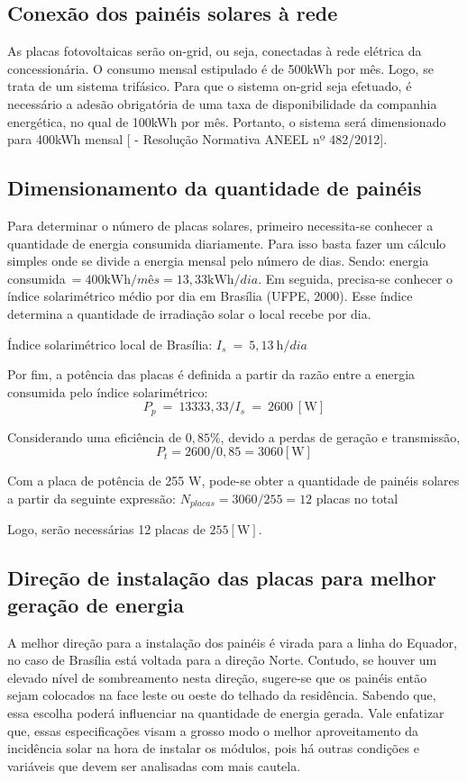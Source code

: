 \subsection{Conexão dos painéis solares à rede}

	As placas fotovoltaicas serão on-grid, ou seja, conectadas à rede elétrica da concessionária. O consumo mensal estipulado é de 500kWh por mês. Logo, se trata de um sistema trifásico. Para que o sistema on-grid seja efetuado, é necessário a adesão obrigatória de uma taxa de disponibilidade da companhia energética, no qual de 100kWh por mês. Portanto, o sistema será dimensionado para 400kWh mensal [\cite{2013Aneel} -  Resolução Normativa ANEEL nº 482/2012].

\subsection{Dimensionamento da quantidade de painéis}

	Para determinar o número de placas solares, primeiro necessita-se conhecer a quantidade de energia consumida diariamente. Para isso basta fazer um cálculo simples onde se divide a energia mensal pelo número de dias. Sendo: energia consumida$\ = 400 \si{\kilo\watt\hour}/mês = 13,33 \si{\kilo\watt\hour}/dia$. Em seguida, precisa-se conhecer o índice solarimétrico médio por dia em Brasília (UFPE, 2000). Esse índice determina a quantidade de irradiação solar o local recebe por dia.

	Índice solarimétrico local de Brasília: $I_s\ =\ 5,13\ \si{\hour}/dia$

	Por fim, a potência das placas é definida a partir da razão entre a energia consumida pelo índice solarimétrico:$$P_p\ =\ 13333,33/I_s\ =\ 2600\ [\si{\watt}]$$

	Considerando uma eficiência de $0,85\%$, devido a perdas de geração e transmissão, $$P_t = 2600/0,85 = 3060 [\si{\watt}]$$

	Com a placa de potência de 255 W, pode-se obter a quantidade de painéis solares a partir da seguinte expressão: $N_{placas} = 3060/255 = 12$ placas no total

	Logo, serão necessárias 12 placas de $255 [\si{\watt}]$.

\subsection{Direção de instalação das placas para melhor geração de energia}

	A melhor direção para a instalação dos painéis é virada para a linha do Equador, no caso de Brasília está voltada para a direção Norte. Contudo, se houver um elevado nível de sombreamento nesta direção, sugere-se que os painéis então sejam colocados na face leste ou oeste do telhado da residência. Sabendo que, essa escolha poderá influenciar na quantidade de energia gerada. Vale enfatizar que, essas especificações visam a grosso modo o melhor aproveitamento da incidência solar na hora de instalar os módulos, pois há outras condições e variáveis que devem ser analisadas com mais cautela.

